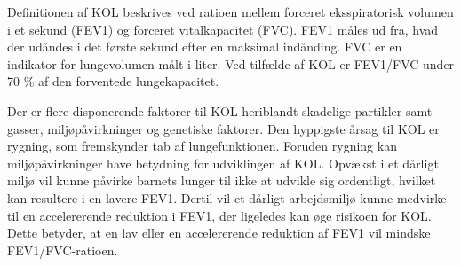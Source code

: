 Definitionen af KOL beskrives ved ratioen mellem forceret eksspiratorisk volumen i et sekund (FEV1) og forceret vitalkapacitet (FVC). FEV1 måles ud fra, hvad der udåndes i det første sekund efter en maksimal indånding. FVC er en indikator for lungevolumen målt i liter. Ved tilfælde af KOL er FEV1/FVC under 70 \% af den forventede lungekapacitet. \cite{Basisbogen2016}


Der er flere disponerende faktorer til KOL heriblandt skadelige partikler samt gasser, miljøpåvirkninger og genetiske faktorer. Den hyppigste årsag til KOL er rygning, som fremskynder tab af lungefunktionen.\cite{dsam2016,Basisbogen2016,Martinez2016} Foruden rygning kan miljøpåvirkninger have betydning for udviklingen af KOL. Opvækst i et dårligt miljø vil kunne påvirke barnets lunger til ikke at udvikle sig ordentligt, hvilket kan resultere i en lavere FEV1. Dertil vil et dårligt arbejdsmiljø kunne medvirke til en accelererende reduktion i FEV1, der ligeledes kan øge risikoen for KOL. \cite{Martinez2016} Dette betyder, at en lav eller en accelererende reduktion af FEV1 vil mindske FEV1/FVC-ratioen.  
